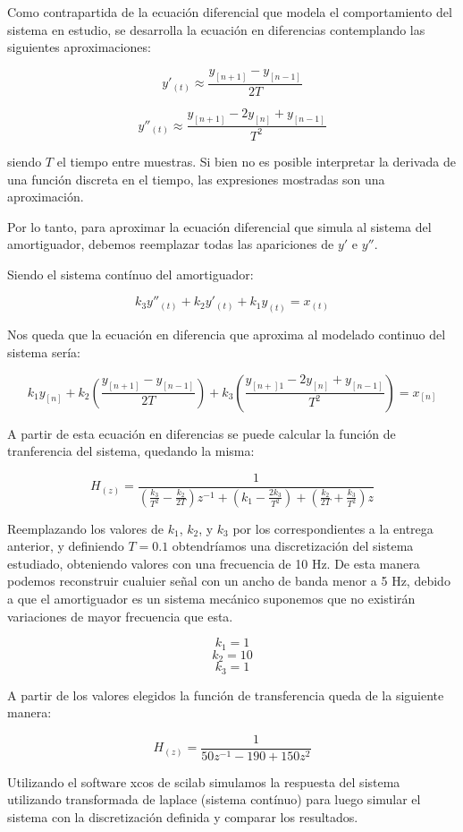 \documentclass{article}
\begin{document}
Como contrapartida de la ecuación diferencial que modela el comportamiento del sistema en estudio, se desarrolla la ecuación en diferencias contemplando las siguientes aproximaciones:

$$y'_{(t)} \approx \frac{y_{[n+1]}-y_{[n-1]}}{2T}$$

$$y''_{(t)} \approx \frac{y_{[n+1]} - 2 y_{[n]} + y_{[n-1]}}{T^2}$$

siendo $T$ el tiempo entre muestras. Si bien no es posible interpretar la derivada de una función discreta en el tiempo, las expresiones mostradas son una aproximación.


Por lo tanto, para aproximar la ecuación diferencial que simula al sistema del amortiguador, debemos reemplazar todas las apariciones de $y'$ e $y''$.

Siendo el sistema contínuo del amortiguador:

$$k_3 y''_{(t)} + k_2 y'_{(t)} + k_1 y_{(t)} = x_{(t)}$$

Nos queda que la ecuación en diferencia que aproxima al modelado continuo del sistema sería:

$$k_1 y_{[n]} + k_2 \left(\frac{y_{[n+1]}-y_{[n-1]}}{2T}\right) + k_3 \left(\frac{y_{[n+]1} - 2 y_{[n]} + y_{[n-1]}}{T^2}\right)= x_{[n]}$$

A partir de esta ecuación en diferencias se puede calcular la función de tranferencia del sistema, quedando la misma:

$$H_{(z)} = \frac{1}{\left(\frac{k_3}{T^2} - \frac{k_2}{2T}\right) z^{-1} + \left(k_1-\frac{2k_3}{T^2}\right) + \left(\frac{k_2}{2T} + \frac{k_3}{T^2}\right) z} $$


Reemplazando los valores de $k_1$, $k_2$, y $k_3$ por los correspondientes a la entrega anterior, y definiendo $T=0.1$ obtendríamos una discretización del sistema estudiado, obteniendo valores con una frecuencia de 10 Hz. De esta manera podemos reconstruir cualuier señal con un ancho de banda menor a 5 Hz, debido a que el amortiguador es un sistema mecánico suponemos que  no existirán variaciones de mayor frecuencia que esta.

$$ k_1 =1$$
$$k_2 =10$$
$$k_3=1$$

A partir de los valores elegidos la función de transferencia queda de la siguiente manera:

$$H_{(z)} = \frac{1}{50 z^{-1} - 190 + 150 z^{2}}$$

Utilizando el software xcos de scilab simulamos la respuesta del sistema utilizando transformada de laplace (sistema contínuo) para luego simular el sistema con la discretización definida y comparar los resultados.
\end{document}
